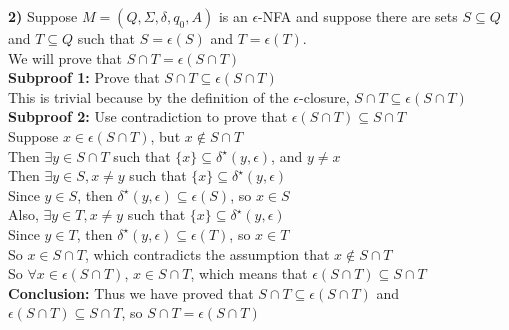 \documentclass{article}
\begin{document}
\textbf{2)} Suppose $M = (Q, \Sigma, \delta, q_0, A)$ is an $\epsilon$-NFA and suppose there are sets $S \subseteq Q$ and $T \subseteq Q$ such that $S = \epsilon(S)$ and $T = \epsilon(T)$.\\
We will prove that $S \cap T = \epsilon(S \cap T)$\\
\textbf{Subproof 1:} Prove that $S \cap T \subseteq \epsilon(S \cap T)$\\
This is trivial because by the definition of the $\epsilon$-closure, $S \cap T \subseteq \epsilon(S \cap T)$\\
\textbf{Subproof 2:} Use contradiction to prove that $\epsilon(S \cap T) \subseteq  S \cap T $\\
Suppose $x \in \epsilon(S \cap T)$, but $x \notin S \cap T$\\
Then $\exists y \in S \cap T$ such that $\{x\} \subseteq \delta^\star(y, \epsilon)$, and $y \neq x$\\
Then $\exists y \in S, x \neq y$ such that $\{x\} \subseteq \delta^\star(y, \epsilon)$\\
Since $y \in S$, then $\delta^\star(y,\epsilon) \subseteq \epsilon(S)$, so $x \in S$\\
Also, $\exists y \in T, x \neq y$ such that $\{x\} \subseteq \delta^\star(y, \epsilon)$\\
Since $y \in T$, then $\delta^\star(y,\epsilon) \subseteq \epsilon(T)$, so $x \in T$\\
So $x \in S \cap T$, which contradicts the assumption that $x \notin S \cap T$\\
So $\forall x \in \epsilon(S \cap T)$, $x \in S \cap T$, which means that $\epsilon(S \cap T) \subseteq  S \cap T $\\ 
\textbf{Conclusion:} Thus we have proved that $S \cap T \subseteq \epsilon(S \cap T)$ and $\epsilon(S \cap T) \subseteq  S \cap T $, so $S \cap T = \epsilon(S \cap T)$\\
\end{document}
